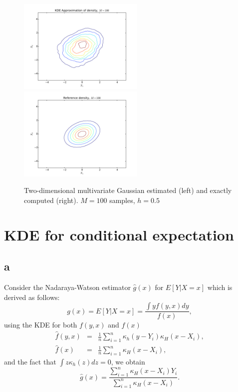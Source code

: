 \documentclass[a4paper,11pt]{article}
\begin{document}
\begin{figure}
\begin{center}
\includegraphics[width=60mm]{./approximation.pdf}
\includegraphics[width=60mm]{./reference.pdf}
\caption{
\label{fig:2ddens}
Two-dimensional multivariate Gaussian estimated (left) and exactly computed (right).
$M=100$ samples, $h=0.5$ 
}
\end{center}
\end{figure}

\section*{KDE for conditional expectation}

\subsection*{a}

Consider the Nadaraya-Watson estimator $\hat{g}(x)$ for $E[Y|X=x]$ which is derived as follows:
\begin{equation*}
g(x) = E[Y|X=x] = \frac{\int y f(y,x) dy}{f(x)},
\end{equation*}
using the KDE for both $f(y,x)$ and $f(x)$
\begin{eqnarray*}
\hat{f}(y,x) &=& \frac{1}{n} \sum_{i = 1}^{n} \kappa_{h}(y - Y_i) \kappa_{H}(x - X_i), \\
\hat{f}(x) &=& \frac{1}{n} \sum_{i = 1}^{n} \kappa_{H}(x - X_i),
\end{eqnarray*}
and the fact that $\int z\kappa_{h} (z)dz = 0$, we obtain
\begin{equation*}
\hat{g}(x) = \frac{ \sum_{i = 1}^{n}\kappa_{H}(x - X_i) Y_{i}}{\sum_{i = 1}^{n} \kappa_{H}(x - X_i)}.
\end{equation*}
\end{document}
